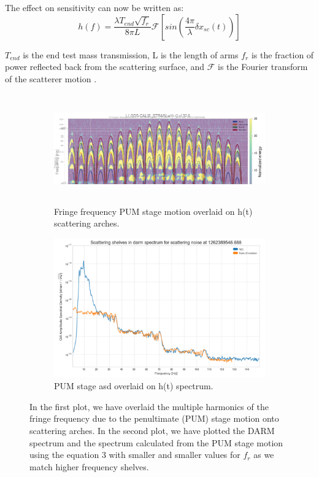 \documentclass[12pt]{iopart}
\begin{document}
The effect on sensitivity can now be written as:
\begin{equation}
    h(f) = \frac{\lambda T_{end}\sqrt{f_{r}}}{8{\pi}L}\mathcal{F}[sin(\frac{4{\pi}}{\lambda}{\delta x_{sc}(t)})]  \label{eq:8}
\end{equation}

$T_{end}$ is the end test mass transmission, L is the length of arms $f_{r}$ is the fraction of power reflected back from the scattering surface, and $\mathcal{F}$ is the Fourier transform of the scatterer motion \cite{vaj_scat}.
\begin{figure}[h]
   \centering
    \begin{subfigure}[b]{0.45\textwidth}
        \centering
         \includegraphics[width= \textwidth,height=4.7cm]{fringel2.png}
         \caption{Fringe frequency PUM stage motion overlaid on h(t) scattering arches.}
         \label{fig:fringel2}
    \end{subfigure}
    \hfill
    \begin{subfigure}[b]{0.45\textwidth}
        \centering
         \includegraphics[width =\textwidth]{spectruml2a.png}
         \caption{PUM stage asd overlaid on h(t) spectrum.}
         \label{fig:spectruml2}
         
    
    \end{subfigure}
    \caption{In the first plot, we have overlaid the multiple harmonics of the fringe frequency due to the penultimate (PUM) stage motion onto scattering arches. In the second plot, we have plotted the DARM spectrum and the spectrum calculated from the PUM stage motion using the equation 3 with smaller and smaller values for $f_{r}$ as we match higher frequency shelves.}
    \label{fig:fringespectrum}
    
\end{figure}
\end{document}
